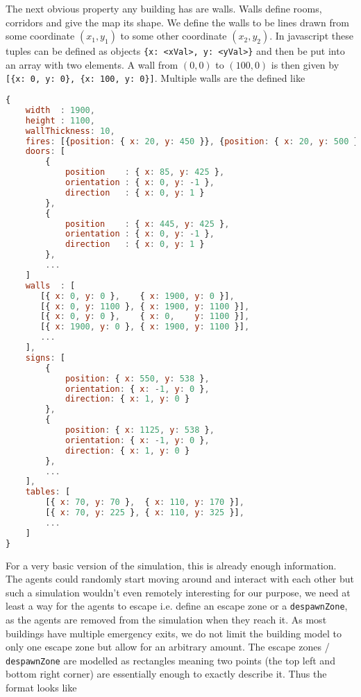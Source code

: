 \documentclass[11pt]{article}
\begin{document}
The next obvious property any building has are walls. Walls define rooms, corridors and give the map its shape. We define the walls to be lines drawn from some coordinate $(x_1, y_1)$ to some other coordinate $(x_2, y_2)$. In javascript these tuples can be defined as objects \texttt{\{x: <xVal>, y: <yVal>\}} and then be put into an array with two elements. A wall from $(0,0)$ to $(100, 0)$ is then given by \texttt{[\{x: 0, y: 0\}, \{x: 100, y: 0\}]}. Multiple walls are the defined like

\begin{lstlisting}[language=javascript]
{
    width  : 1900,
    height : 1100,
    wallThickness: 10,
    fires: [{position: { x: 20, y: 450 }}, {position: { x: 20, y: 500 }}],
    doors: [
        {
            position    : { x: 85, y: 425 },
            orientation : { x: 0, y: -1 },
            direction   : { x: 0, y: 1 }
        },
        {
            position    : { x: 445, y: 425 },
            orientation : { x: 0, y: -1 },
            direction   : { x: 0, y: 1 }
        },
        ...
    ]
    walls  : [
       [{ x: 0, y: 0 },    { x: 1900, y: 0 }],
       [{ x: 0, y: 1100 }, { x: 1900, y: 1100 }],
       [{ x: 0, y: 0 },    { x: 0,    y: 1100 }],
       [{ x: 1900, y: 0 }, { x: 1900, y: 1100 }],
       ...
    ],
    signs: [
        {
            position: { x: 550, y: 538 },
            orientation: { x: -1, y: 0 },
            direction: { x: 1, y: 0 }
        },
        {
            position: { x: 1125, y: 538 },
            orientation: { x: -1, y: 0 },
            direction: { x: 1, y: 0 }
        },
        ...
    ],
    tables: [
        [{ x: 70, y: 70 },  { x: 110, y: 170 }],
        [{ x: 70, y: 225 }, { x: 110, y: 325 }],
        ...
    ]
}
\end{lstlisting}

For a very basic version of the simulation, this is already enough information. The agents could randomly start moving around and interact with each other but such a simulation wouldn't even remotely interesting for our purpose, we need at least a way for the agents to escape i.e. define an escape zone or a \texttt{despawnZone}, as the agents are removed from the simulation when they reach it. As most buildings have multiple emergency exits, we do not limit the building model to only one escape zone but allow for an arbitrary amount. The escape zones / \texttt{despawnZone} are modelled as rectangles meaning two points (the top left and bottom right corner) are essentially enough to exactly describe it. Thus the format looks like
\end{document}
